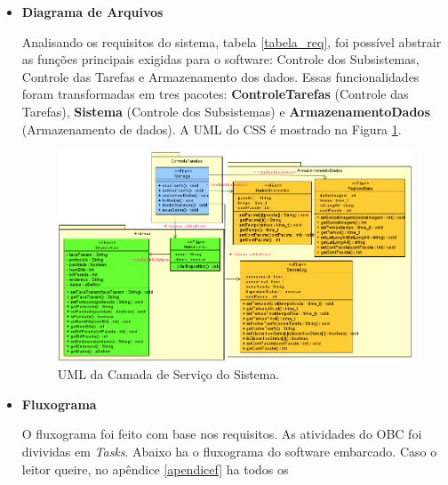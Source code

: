 \begin{itemize}
	
\item \textbf{Diagrama de Arquivos}

Analisando os requisitos do sistema, tabela \ref{tabela_req}, foi possível abstrair as funções principais exigidas para o software: Controle dos Subsistemas, Controle das Tarefas e  Armazenamento dos dados. Essas funcionalidades foram transformadas em tres pacotes: \textbf{ControleTarefas} (Controle das Tarefas), \textbf{Sistema} (Controle dos Subsistemas) e \textbf{ArmazenamentoDados} (Armazenamento de dados). A UML do CSS é mostrado na Figura \ref{uml_CSS}.

\begin{figure}[h]
	\centering
	\includegraphics[keepaspectratio=true,scale=0.72]{figuras/CSS.png}
	\caption{UML da Camada de Serviço do Sistema.}
	\label{uml_CSS}
\end{figure}

\item \textbf{Fluxograma}

O fluxograma foi feito com base nos requisitos. As atividades do OBC foi divividas em \textit{Tasks}. Abaixo ha o fluxograma do software embarcado. Caso o leitor queire, no apêndice \ref{apendicef} ha todos os 


\end{itemize}
